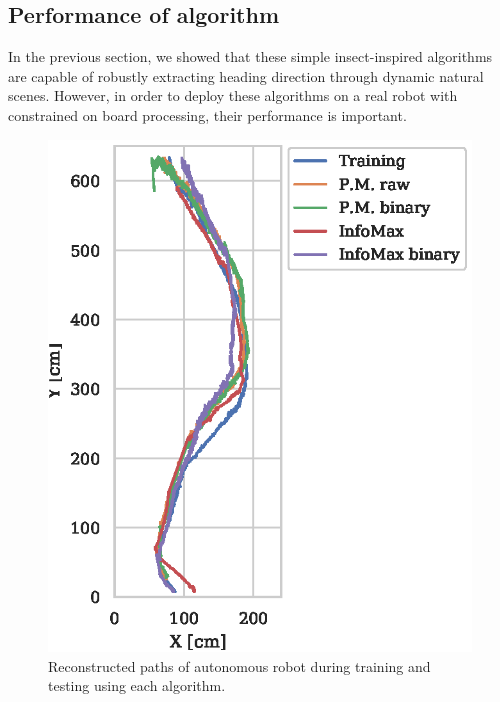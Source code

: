 \documentclass[letterpaper]{article}
\begin{document}
\subsection{Performance of algorithm}
In the previous section, we showed that these simple insect-inspired algorithms are capable of robustly extracting heading direction through dynamic natural scenes. 
However, in order to deploy these algorithms on a real robot with constrained on board processing, their performance is important. 

\begin{figure}[t]
    \includegraphics{figures/robot_paths.eps}
    \caption{Reconstructed paths of autonomous robot during training and testing using each algorithm.}
    \label{robot_paths}
\end{figure}
\end{document}
